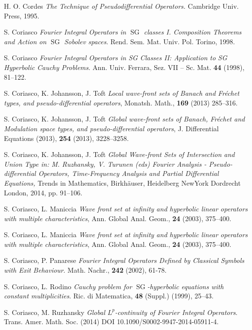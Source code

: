 \documentclass[12pt,a4paper,reqno]{amsart}
\numberwithin{equation}{section}
\numberwithin{thm}{section}
\theoremstyle{definition}
\theoremstyle{remark}
\begin{document}
\begin{thebibliography}{150}
 H. O. Cordes \emph{The Technique of Pseudodifferential
Operators.} Cambridge Univ. Press, 1995.

 S. Coriasco \emph{Fourier Integral Operators in ${\operatorname{SG}}$
classes I. Composition Theorems and Action on ${\operatorname{SG}}$ Sobolev spaces}.
Rend. Sem. Mat. Univ. Pol. Torino, 1998.

 S. Coriasco \emph{Fourier Integral Operators
in SG Classes II: Application to SG Hyperbolic Cauchy Problems}.
Ann. Univ. Ferrara, Sez. VII -- Sc. Mat. \textbf{44} (1998), 81--122.

 S. Coriasco, K. Johansson, J. Toft \emph{Local
wave-front sets of Banach and Fr{\'e}chet types, and pseudo-differential
operators}, {Monatsh. Math.},
\textbf{169} (2013) 285--316.
 
 S. Coriasco, K. Johansson, J. Toft \emph{Global wave-front
sets of Banach, Fr{\'e}chet and Modulation space types, and pseudo-differential
operators}, {J. Differential Equations} (2013), \textbf{254} (2013), 3228--3258.

 S. Coriasco, K. Johansson, J. Toft
\emph{Global Wave-front Sets of Intersection and Union Type
{\rm
{in: M. Ruzhansky, V. Turunen (eds)}}
Fourier Analysis - Pseudo-differential Operators, Time-Frequency
Analysis and Partial Differential Equations,}
Trends in Mathematics, Birkh{\"a}user,
Heidelberg NewYork Dordrecht London, 2014, pp. 91--106.

 S. Coriasco, L. Maniccia \emph{Wave front set
at infinity and hyperbolic linear operators with multiple characteristics},
{Ann. Global Anal. Geom.}, \textbf{24} (2003), 375--400.

 S. Coriasco, L. Maniccia \emph{Wave front set
at infinity and hyperbolic linear operators with multiple characteristics},
{Ann. Global Anal. Geom.}, \textbf{24} (2003), 375--400.

 S. Coriasco, P. Panarese \emph{Fourier Integral Operators Defined by 
Classical Symbols with Exit Behaviour}. {Math. Nachr.}, \textbf{242} (2002), 61-78.

 S. Coriasco, L. Rodino \emph{Cauchy problem for
${\operatorname{SG}}$-hyperbolic equations with constant multiplicities}. Ric. di
Matematica, \textbf{48} (Suppl.) (1999), 25--43.

 S. Coriasco, M. Ruzhansky \emph{Global $L^p$-continuity
of Fourier Integral Operators}. 
Trans. Amer. Math. Soc. (2014) DOI 10.1090/S0002-9947-2014-05911-4.


\end{thebibliography}
\end{document}
